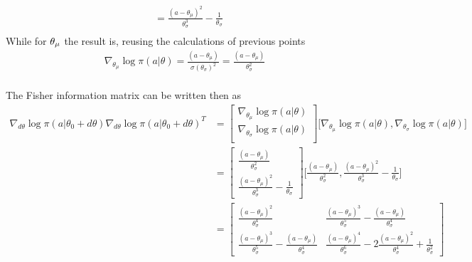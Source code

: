 \documentclass{exam}
\begin{document}
\begin{enumerate}
\begin{solutionorlines}[2in]
\begin{align*}
                &= \frac{(a - \theta_{\mu})^2}{\theta_{\sigma}^3} - \frac{1}{\theta_{\sigma}} \\
            \end{align*}
            While for $\theta_{\mu}$ the result is, reusing the calculations of previous points
            \begin{align*}
                \nabla_{\theta_{\mu}} \log \pi(a | \theta) =  \frac{(a - \theta_{\mu})}{\sigma(\theta_{\sigma})^2} = \frac{(a - \theta_{\mu})}{\theta_{\sigma}^2} \\
            \end{align*}
            
            The Fisher information matrix can be written then as
            \begin{align*}
                \nabla_{d\theta} \log \pi(a | \theta_0 + d\theta) \nabla_{d\theta} \log \pi(a | \theta_0 + d\theta)^T &= \begin{bmatrix}
                    \nabla_{\theta_\mu} \log \pi(a | \theta) \\
                    \nabla_{\theta_\sigma} \log \pi(a | \theta) \\
                \end{bmatrix} \big[ \nabla_{\theta_\mu} \log \pi(a | \theta), \nabla_{\theta_\sigma} \log \pi(a | \theta) \big] \\
                &= \begin{bmatrix}
                    \frac{(a - \theta_{\mu})}{\theta_{\sigma}^2} \\
                    \frac{(a - \theta_{\mu})^2}{\theta_{\sigma}^3} - \frac{1}{\theta_{\sigma}}
                \end{bmatrix}
                \big[ \frac{(a - \theta_{\mu})}{\theta_{\sigma}^2}, \frac{(a - \theta_{\mu})^2}{\theta_{\sigma}^3} - \frac{1}{\theta_{\sigma}}  \big] \\
                &= \begin{bmatrix}
                    \frac{(a - \theta_{\mu})^2}{\theta_{\sigma}^4} & 
                    \frac{(a - \theta_{\mu})^3}{\theta_{\sigma}^5} - \frac{(a - \theta_{\mu})}{\theta_{\sigma}^4}\\
                    \frac{(a - \theta_{\mu})^3}{\theta_{\sigma}^5} - \frac{(a - \theta_{\mu})}{\theta_{\sigma}^4} & \frac{(a - \theta_{\mu})^4}{\theta_{\sigma}^6} - 2\frac{(a - \theta_{\mu})^2}{\theta_{\sigma}^4}  + \frac{1}{\theta_{\sigma}^2}
                \end{bmatrix}
            \end{align*}
            

\end{solutionorlines}
\end{enumerate}
\end{document}
